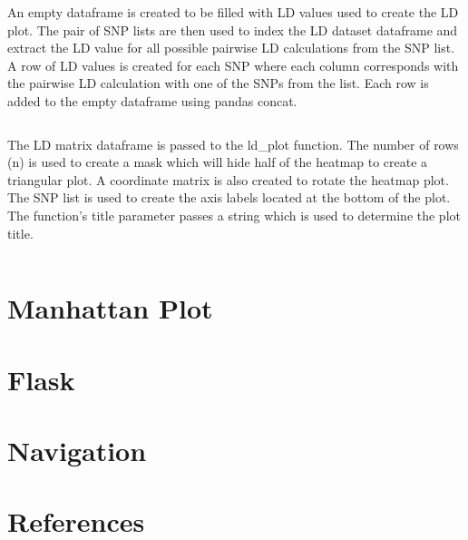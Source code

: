 \documentclass[12pt,a4paper]{article}
\newcommand{\sect}[1]{
\hypertarget{#1}{
\section{#1}\label{#1}}
}
\begin{document}
An empty dataframe is created to be filled with LD values used to create the LD plot. The pair of SNP lists are then used to index the LD dataset dataframe and extract the LD value for all possible pairwise LD calculations from the SNP list. A row of LD values is created for each SNP where each column corresponds with the pairwise LD calculation with one of the SNPs from the list. Each row is added to the empty dataframe using pandas concat.
\inputminted{python}{code_snippets/placeholder.py}

The LD matrix dataframe is passed to the ld\_plot function. The number of rows (n) is used to create a mask which will hide half of the heatmap to create a triangular plot. A coordinate matrix is also created to rotate the heatmap plot. The SNP list is used to create the axis labels located at the bottom of the plot. The function’s title parameter passes a string which is used to determine the plot title.
\inputminted{python}{code_snippets/placeholder.py}

\sect{Manhattan Plot}

\sect{Flask}

\sect{Navigation}

\sect{References}
\end{document}
